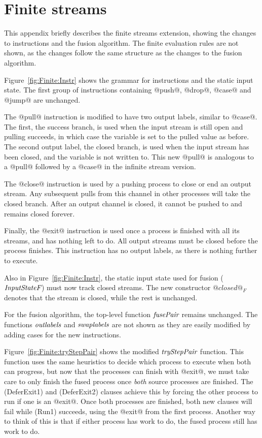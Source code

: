 \clearpage{}

\section{Finite streams}
\label{s:FiniteDetails}

This appendix briefly describes the finite streams extension, showing the changes to instructions and the fusion algorithm.
The finite evaluation rules are not shown, as the changes follow the same structure as the changes to the fusion algorithm.


Figure~\ref{fig:Finite:Instr} shows the grammar for instructions and the static input state. The first group of instructions containing @push@, @drop@, @case@ and @jump@ are unchanged.

The @pull@ instruction is modified to have two output labels, similar to @case@. The first, the success branch, is used when the input stream is still open and pulling succeeds, in which case the variable is set to the pulled value as before. The second output label, the closed branch, is used when the input stream has been closed, and the variable is not written to. This new @pull@ is analogous to a @pull@ followed by a @case@ in the infinite stream version.

The @close@ instruction is used by a pushing process to close or end an output stream. Any subsequent pulls from this channel in other processes will take the closed branch. After an output channel is closed, it cannot be pushed to and remains closed forever.

Finally, the @exit@ instruction is used once a process is finished with all its streams, and has nothing left to do. All output streams must be closed before the process finishes. This instruction has no output labels, as there is nothing further to execute.

Also in Figure~\ref{fig:Finite:Instr}, the static input state used for fusion ($\textit{InputStateF}$) must now track closed streams. The new constructor $@closed@_F$ denotes that the stream is closed, while the rest is unchanged.

For the fusion algorithm, the top-level function $\textit{fusePair}$ remains unchanged. The functions $\textit{outlabels}$ and $\textit{swaplabels}$ are not shown as they are easily modified by adding cases for the new instructions.

Figure~\ref{fig:Finite:tryStepPair} shows the modified $\textit{tryStepPair}$ function. This function uses the same heuristics to decide which process to execute when both can progress, but now that the processes can finish with @exit@, we must take care to only finish the fused process once \emph{both} source processes are finished. The (DeferExit1) and (DeferExit2) clauses achieve this by forcing the other process to run if one is an @exit@. Once both processes are finished, both new clauses will fail while (Run1) succeeds, using the @exit@ from the first process. Another way to think of this is that if either process has work to do, the fused process still has work to do.

